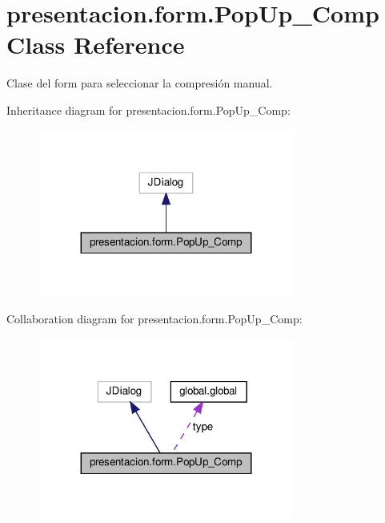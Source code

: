 \hypertarget{classpresentacion_1_1form_1_1PopUp__Comp}{}\section{presentacion.\+form.\+Pop\+Up\+\_\+\+Comp Class Reference}
\label{classpresentacion_1_1form_1_1PopUp__Comp}


Clase del form para seleccionar la compresión manual.  




Inheritance diagram for presentacion.\+form.\+Pop\+Up\+\_\+\+Comp\+:\nopagebreak
\begin{figure}[H]
\begin{center}
\leavevmode
\includegraphics[width=239pt]{classpresentacion_1_1form_1_1PopUp__Comp__inherit__graph}
\end{center}
\end{figure}


Collaboration diagram for presentacion.\+form.\+Pop\+Up\+\_\+\+Comp\+:\nopagebreak
\begin{figure}[H]
\begin{center}
\leavevmode
\includegraphics[width=239pt]{classpresentacion_1_1form_1_1PopUp__Comp__coll__graph}
\end{center}
\end{figure}
